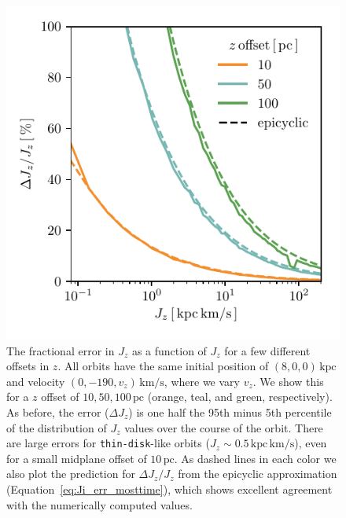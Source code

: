 \documentclass[twocolumn]{aastex62}
\newcommand{\pc}{\text{pc}}
\newcommand{\kpc}{\text{kpc}}
\newcommand{\kms}{\text{km}/\text{s}}
\newcommand{\actunit}{\text{kpc}\,\kms}
\newcommand{\thin}{\texttt{thin-disk}}
\begin{document}
\begin{figure}
\begin{center}
\includegraphics[width=\columnwidth]{fig/schmactions_many_orbits_Jz_fun.pdf}
\end{center}
\caption{The fractional error in $J_z$ as a function of $J_z$ for a few
different offsets in $z$. All orbits have the same initial position of $(8, 0,
0)\,\kpc$ and velocity $(0, -190, v_z)\,\kms$, where we vary $v_z$. We show
this for a $z$ offset of $10, 50, 100\,\pc$ (orange, teal, and green,
respectively). As before, the error ($\Delta J_z$) is one half the 95th
minus 5th percentile of the distribution of $J_z$ values over the
course of the orbit. There are large errors for \thin{}-like orbits ($J_z
\sim 0.5\,\actunit$), even for a small midplane offset of $10\,\pc$. As dashed
lines in each color we also plot the prediction for $\Delta J_z/J_z$ from the
epicyclic approximation (Equation~\eqref{eq:Ji_err_mosttime}), which shows
excellent agreement with the numerically computed values.}
\label{fig:dJz_fun_Jz}
\end{figure}
\end{document}
